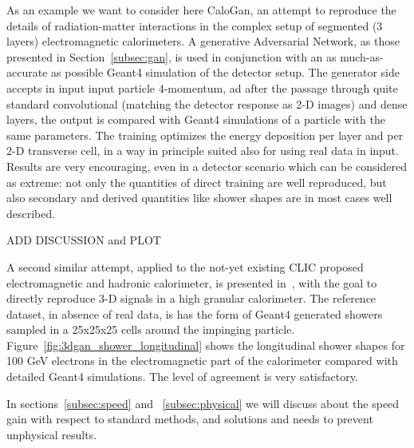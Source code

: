 As an example we want to consider here CaloGan\cite{calogan}, an attempt to reproduce the details of radiation-matter interactions in the complex setup of segmented (3 layers) electromagnetic calorimeters.
A generative Adversarial Network, as those presented in Section~\ref{subsec:gan}, is used in conjunction with an as much-as-accurate as possible Geant4 simulation of the detector setup. The generator side accepts in input input particle 4-momentum, ad after the passage through quite standard convolutional (matching the detector response as 2-D images) and dense layers, the output is compared with Geant4 simulations of a particle with the same parameters.  The training optimizes the energy deposition per layer and per 2-D transverse cell, in a way in principle suited also for using real data in input. Results are very encouraging, even in a detector scenario which can be considered as extreme: not only the quantities of direct training are well reproduced, but also secondary and derived quantities like shower shapes are in most cases well described.

ADD DISCUSSION and PLOT



A second similar attempt, applied to the not-yet existing CLIC proposed electromagnetic and hadronic calorimeter, is presented in~\cite{3dgan}, with the goal to directly reproduce 3-D signals in a high granular calorimeter. The reference dataset, in absence of real data, is has the form of Geant4 generated showers sampled in a 25x25x25 cells around the impinging particle.
Figure~\ref{fig:3dgan_shower_longitudinal} shows the longitudinal shower shapes for 100 GeV electrons in the electromagnetic part of the calorimeter compared with detailed Geant4 simulations. The level of agreement is very satisfactory.

In sections~\ref{subsec:speed} and ~\ref{subsec:physical} we will discuss about the speed gain with respect to standard methods, and solutions and needs to prevent unphysical results.

